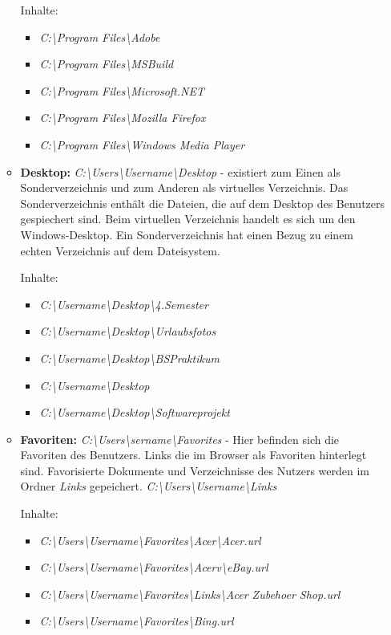 \begin{itemize}
\begin{itemize}
	Inhalte:
	\begin{itemize}
		\item \textit{C:\textbackslash Program Files\textbackslash Adobe}
		\item \textit{C:\textbackslash Program Files\textbackslash MSBuild}
		\item \textit{C:\textbackslash Program Files\textbackslash Microsoft.NET}
		\item \textit{C:\textbackslash Program Files\textbackslash Mozilla Firefox}
		\item \textit{C:\textbackslash Program Files\textbackslash Windows Media Player}
\end{itemize}
\item \textbf{Desktop:}	 \textit{C:\textbackslash Users\textbackslash Username\textbackslash Desktop} -
	existiert zum Einen als Sonderverzeichnis und zum Anderen als virtuelles Verzeichnis.
	Das Sonderverzeichnis enthält die Dateien, die auf dem Desktop des Benutzers gespiechert sind.
	Beim virtuellen Verzeichnis handelt es sich um den Windows-Desktop. Ein Sonderverzeichnis hat einen
	Bezug zu einem echten Verzeichnis auf dem Dateisystem.

	Inhalte:
	\begin{itemize}
	\item \textit{C:\textbackslash Username\textbackslash Desktop\textbackslash4.Semester}
	\item \textit{C:\textbackslash Username\textbackslash Desktop\textbackslash Urlaubsfotos}
	\item \textit{ C:\textbackslash Username\textbackslash Desktop\textbackslash BSPraktikum }
	\item \textit{ C:\textbackslash Username\textbackslash Desktop }
	\item \textit{ C:\textbackslash Username\textbackslash Desktop\textbackslash Softwareprojekt }
\end{itemize}

\item \textbf{Favoriten:}	\textit{C:\textbackslash Users\textbackslash sername\textbackslash Favorites} -
	Hier befinden sich die Favoriten des Benutzers. Links die im Browser als Favoriten
	hinterlegt sind. Favorisierte Dokumente und Verzeichnisse des Nutzers werden im Ordner \textit{Links}
	gepeichert. \textit{C:\textbackslash Users\textbackslash Username\textbackslash Links}

	Inhalte:
	\begin{itemize}
	\item \textit{C:\textbackslash Users\textbackslash Username\textbackslash Favorites\textbackslash Acer\textbackslash Acer.url}
	\item \textit{C:\textbackslash Users\textbackslash Username\textbackslash Favorites\textbackslash Acerv\textbackslash eBay.url}
	\item \textit{‪C:\textbackslash Users\textbackslash Username\textbackslash Favorites\textbackslash Links\textbackslash Acer Zubehoer Shop.url}
	‪\item \textit{C:\textbackslash Users\textbackslash Username\textbackslash Favorites\textbackslash Bing.url}
\end{itemize}


\end{itemize}
\end{itemize}
